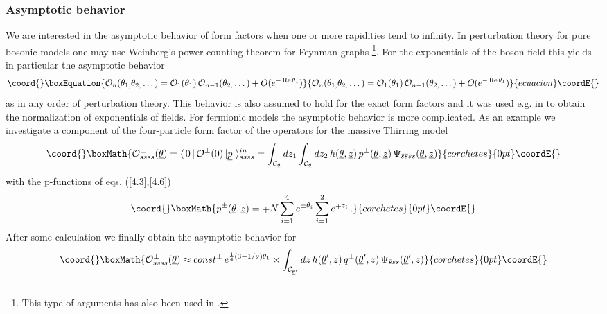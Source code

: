 \documentclass[a4paper,a4paper]{article}
\begin{document}
\subsubsection{Asymptotic behavior}

We are interested in the asymptotic behavior of form factors when one or
more rapidities tend to infinity. In perturbation theory for pure bosonic
models one may use Weinberg's power counting theorem for Feynman graphs \cite
{BK}\footnote{%
This type of arguments has also been used in \cite{KW,FMS,KM,MS}.}. For the
exponentials of the boson field \coordHE{} this
yields in particular the asymptotic behavior 
\begin{equation}\coord{}\boxEquation{
\mathcal{O}_{n}(\theta _{1,}\theta _{2,}\dots )=\mathcal{O}_{1}(\theta
_{1})\,\mathcal{O}_{n-1}(\theta _{2,}\dots )+O(e^{-\mathop{\rm Re}\theta
_{1}})  \label{4.8}
}{
\mathcal{O}_{n}(\theta _{1,}\theta _{2,}\dots )=\mathcal{O}_{1}(\theta
_{1})\,\mathcal{O}_{n-1}(\theta _{2,}\dots )+O(e^{-\mathop{\rm Re}\theta
_{1}})  }{ecuacion}\coordE{}\end{equation}
as \coordHE{} in any order of
perturbation theory. This behavior is also assumed to hold for the exact
form factors and it was used e.g. in \cite{BK1} to obtain the normalization
of exponentials of fields. For fermionic models the asymptotic behavior is
more complicated. As an example we investigate a component of the
four-particle form factor of the operators \coordHE{} for the massive Thirring model 
\[\coord{}\boxMath{
\mathcal{O}_{\bar{s}\bar{s}ss}^{\pm }(\underline{\theta })=\langle \,0\,|\,%
\mathcal{O}^{\pm }(0)\,|\underline{p}\,\,\rangle _{\bar{s}\bar{s}%
ss}^{in}=\int_{\mathcal{C}_{\underline{\theta }}}dz_{1}\int_{\mathcal{C}_{%
\underline{\theta }}}dz_{2}\,h(\underline{\theta },{\underline{z}})\,p^{\pm
}(\underline{\theta },{\underline{z}})\,\Psi _{\bar{s}\bar{s}ss}(\underline{%
\theta },{\underline{z}}) 
}{corchetes}{0pt}\coordE{}\]
with the p-functions of eqs. (\ref{4.3},\ref{4.6}) 
\[\coord{}\boxMath{
p^{\pm }(\underline{\theta },\underline{z})=\mp N\sum\limits_{i=1}^{4}e^{\pm
\theta _{i}}\sum\limits_{i=1}^{2}e^{\mp z_{i}}\,. 
}{corchetes}{0pt}\coordE{}\]
After some calculation we finally obtain the asymptotic behavior for \coordHE{}%
\[\coord{}\boxMath{
\mathcal{O}_{\bar{s}\bar{s}ss}^{\pm }(\underline{\theta })\approx const^{\pm
}\,e^{\frac{1}{4}(3-1/\nu )\theta _{1}}\times \int_{\mathcal{C}_{\underline{%
\theta }^{\prime }}}dz\,h(\underline{\theta }^{\prime },z)\,q^{\pm }(%
\underline{\theta }^{\prime },{z})\,\Psi _{\bar{s}ss}(\underline{\theta }%
^{\prime },{z}) 
}{corchetes}{0pt}\coordE{}\]
\end{document}
